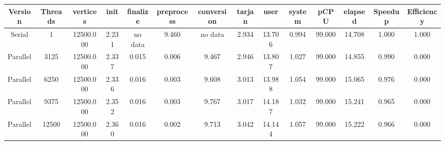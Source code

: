 \begin{tabular}{|c|c|c|c|c|c|c|c|c|c|c|c|c|c|}
\toprule
 Version &  Threads &  vertices &  init & finalize &  preprocess & conversion &  tarjan &   user &  system &   pCPU &  elapsed &  Speedup &  Efficiency \\
\midrule
  Serial &        1 & 12500.000 & 2.231 &  no data &       9.460 &    no data &   2.934 & 13.706 &   0.994 & 99.000 &   14.708 &    1.000 &       1.000 \\
Parallel &     3125 & 12500.000 & 2.337 &    0.015 &       0.006 &      9.467 &   2.946 & 13.807 &   1.027 & 99.000 &   14.855 &    0.990 &       0.000 \\
Parallel &     6250 & 12500.000 & 2.336 &    0.016 &       0.003 &      9.608 &   3.013 & 13.988 &   1.054 & 99.000 &   15.065 &    0.976 &       0.000 \\
Parallel &     9375 & 12500.000 & 2.352 &    0.016 &       0.003 &      9.767 &   3.017 & 14.187 &   1.032 & 99.000 &   15.241 &    0.965 &       0.000 \\
Parallel &    12500 & 12500.000 & 2.360 &    0.016 &       0.002 &      9.713 &   3.042 & 14.144 &   1.057 & 99.000 &   15.222 &    0.966 &       0.000 \\
\bottomrule
\end{tabular}
